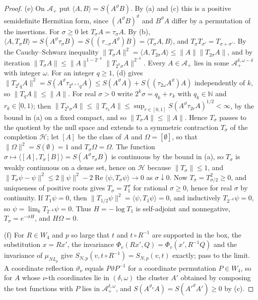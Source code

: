 \documentclass[11pt,a4paper]{amsart}
\theoremstyle{definition}
\theoremstyle{remark}
\numberwithin{equation}{section}
\newcommand{\Nat}{\mathbb{N}}        %
\newcommand{\Hilb}{\mathcal{H}}      %
\newcommand{\ip}[2]{\langle #1,#2\rangle}  %
\newcommand{\norm}[1]{\lVert #1\rVert}     %
\newcommand{\Lp}{L_p}                      %
\begin{document}
\begin{proof}
(e) On $\mathcal A_+$ put $\ip{A}{B}=S(A^\vartheta B)$. By (a) and (c) this is a positive semidefinite Hermitian form, since $(A^\vartheta B)^\vartheta$ and $B^\vartheta A$ differ by a permutation of the insertions. For $\sigma\ge0$ let $T_\sigma A=\tau_\sigma A$. By (b), $\ip{A}{T_\sigma B}=S(A^\vartheta\tau_\sigma B)=S((\tau_{-\sigma}A^\vartheta)B)=\ip{T_\sigma A}{B}$, and $T_\sigma T_{\sigma'}=T_{\sigma+\sigma'}$. By the Cauchy--Schwarz inequality $\norm{T_\sigma A}^2=\ip{A}{T_{2\sigma}A}\le\norm{A}\norm{T_{2\sigma}A}$, and by iteration $\norm{T_\sigma A}\le\norm{A}^{1-2^{-k}}\norm{T_{2^k\sigma}A}^{2^{-k}}$. Every $A\in\mathcal A_+$ lies in some $\mathcal A_+^{\delta,\omega-\delta}$ with integer $\omega$. For an integer $q\ge1$, (d) gives $\norm{T_{2^kq}A}^2=S(A^\vartheta\tau_{2^{k+1}q}A)\le S(A^\vartheta A)+S((\tau_{2\omega}A^\vartheta)A)$ independently of $k$, so $\norm{T_qA}\le\norm{A}$. For real $\sigma>0$ write $2^k\sigma=q_k+r_k$ with $q_k\in\Nat$ and $r_k\in[0,1)$; then $\norm{T_{2^k\sigma}A}\le\norm{T_{r_k}A}\le\sup_{r\in[0,1]}S(A^\vartheta\tau_{2r}A)^{1/2}<\infty$, by the bound in (a) on a fixed compact, and so $\norm{T_\sigma A}\le\norm{A}$. Hence $T_\sigma$ passes to the quotient by the null space and extends to a symmetric contraction $T_\sigma$ of the completion $\Hilb$; let $[A]$ be the class of $A$ and $\Omega=[\emptyset]$, so that $\norm{\Omega}^2=S(\emptyset)=1$ and $T_\sigma\Omega=\Omega$. The function $\sigma\mapsto\ip{[A]}{T_\sigma[B]}=S(A^\vartheta\tau_\sigma B)$ is continuous by the bound in (a), so $T_\sigma$ is weakly continuous on a dense set, hence on $\Hilb$ because $\norm{T_\sigma}\le1$, and $\norm{T_\sigma\psi-\psi}^2\le2\norm{\psi}^2-2\operatorname{Re}\ip{\psi}{T_\sigma\psi}\to0$ as $\sigma\downarrow0$. Now $T_\sigma=T_{\sigma/2}^2\ge0$, and uniqueness of positive roots gives $T_\sigma=T_1^\sigma$ for rational $\sigma\ge0$, hence for real $\sigma$ by continuity. If $T_1\psi=0$, then $\norm{T_{1/2}\psi}^2=\ip{\psi}{T_1\psi}=0$, and inductively $T_{2^{-k}}\psi=0$, so $\psi=\lim_kT_{2^{-k}}\psi=0$. Thus $H=-\log T_1$ is self-adjoint and nonnegative, $T_\sigma=e^{-\sigma H}$, and $H\Omega=0$.

(f) For $R\in W_4$ and $p$ so large that $t$ and $t\circ R^{-1}$ are supported in the box, the substitution $x=Rx'$, the invariance $\Phi_v(Rx',Q)=\Phi_v(x',R^{-1}Q)$ and the invariance of $\mu_{N\Lp}$ give $S_{N,p}(v,t\circ R^{-1})=S_{N,p}(v,t)$ exactly; pass to the limit. A coordinate reflection $\vartheta_\nu$ equals $P\vartheta P^{-1}$ for a coordinate permutation $P\in W_4$, so for $A$ whose $\nu$-th coordinates lie in $(\delta,\omega)$ the cluster $A'$ obtained by composing the test functions with $P$ lies in $\mathcal A_+^{\delta,\omega}$, and $S(A^{\vartheta_\nu}A)=S(A'^\vartheta A')\ge0$ by (c).
\end{proof}
\end{document}
